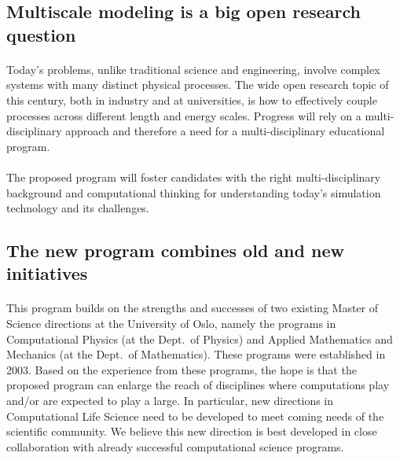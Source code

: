 \documentclass[%
oneside,                 %
final,                   %
10pt]{article}
\begin{document}
\subsection*{Multiscale modeling is a big open research question}


\paragraph{}
Today's problems, unlike traditional
science and engineering, involve complex systems with many distinct
physical processes. The wide open research topic of this century, both
in industry and at universities, is how to effectively couple
processes across different length and energy scales. Progress will
rely on a multi-disciplinary approach and therefore a need for
a multi-disciplinary educational program.




\paragraph{}
The proposed program will foster candidates with the right
multi-disciplinary background and computational thinking for
understanding today's simulation technology and its challenges.



\subsection*{The new program combines old and new initiatives}

\paragraph{}

This program builds on the strengths and successes of two existing Master of Science directions at the University of Oslo, namely the 
programs in Computational Physics (at the Dept.~of Physics) and
Applied Mathematics and Mechanics (at the Dept.~of Mathematics).
These programs were established in 2003.
Based on the experience from these programs, the hope is that the proposed program can enlarge the reach of disciplines where computations play and/or are expected to play  a large. In particular, new directions 
in Computational Life Science need to  be developed to
meet coming needs of the scientific community. We believe this new direction is
best developed in close collaboration with already successful
computational science programs.
\end{document}
